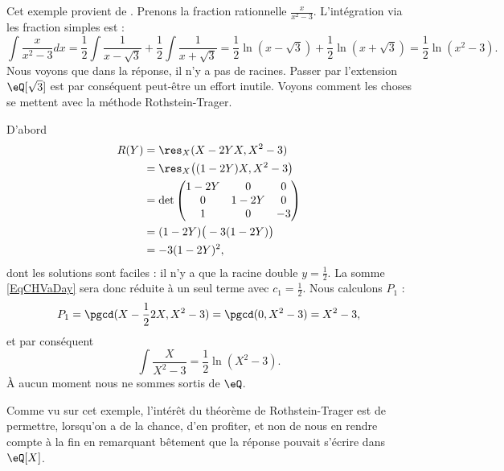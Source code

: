 \begin{example}
    Cet exemple provient de \cite{MKucxNb}. Prenons la fraction rationnelle \( \frac{ x }{ x^2-3 }\). L'intégration via les fraction simples est :
\begin{equation}
    \int\frac{ x }{ x^2-3 }dx=\frac{ 1 }{2}\int\frac{ 1 }{ x-\sqrt{3} }+\frac{ 1 }{2}\int\frac{1}{ x+\sqrt{3} }=\frac{ 1 }{2}\ln(x-\sqrt{3})+\frac{ 1 }{2}\ln(x+\sqrt{3})=\frac{ 1 }{2}\ln(x^2-3).
\end{equation}
Nous voyons que dans la réponse, il n'y a pas de racines. Passer par l'extension \( \eQ[\sqrt{3}]\) est par conséquent peut-être un effort inutile. Voyons comment les choses se mettent avec la méthode Rothstein-Trager.

D'abord
\begin{subequations}
    \begin{align}
        R(Y)&=\res_X(X-2YX,X^2-3)\\
        &=\res_X\big( (1-2Y)X,X^2-3 \big)\\
        &=\det\begin{pmatrix}
            1-2Y    &   0    &   0    \\
            0    &   1-2Y    &   0    \\
            1    &   0    &   -3
        \end{pmatrix}\\
        &=(1-2Y)\big( -3(1-2Y) \big)\\
        &=-3(1-2Y)^2,
    \end{align}
\end{subequations}
dont les solutions sont faciles : il n'y a que la racine double \( y=\frac{ 1 }{2}\). La somme \eqref{EqCHVaDay} sera donc réduite à un seul terme avec \( c_1=\frac{ 1 }{2}\). Nous calculons \( P_1\) :
\begin{equation}
    P_1=\pgcd(X-\frac{ 1 }{2}2X,X^2-3)=\pgcd(0,X^2-3)=X^2-3,
\end{equation}
et par conséquent
\begin{equation}
    \int\frac{ X }{ X^2-3 }=\frac{ 1 }{2}\ln(X^2-3).
\end{equation}
À aucun moment nous ne sommes sortis de \( \eQ\).
\end{example}

Comme vu sur cet exemple, l'intérêt du théorème de Rothstein-Trager est de permettre, lorsqu'on a de la chance, d'en profiter, et non de nous en rendre compte à la fin en remarquant bêtement que la réponse pouvait s'écrire dans \( \eQ[X]\).

